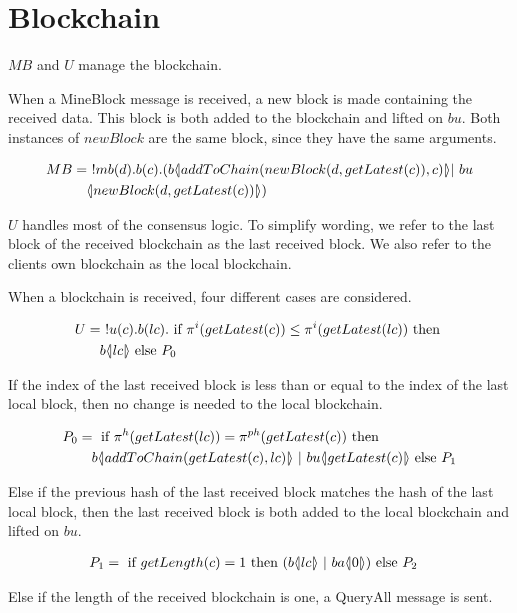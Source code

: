 \section{Blockchain}

$MB$ and $U$ manage the blockchain.

When a MineBlock message is received, a new block is made containing the received data.
This block is both added to the blockchain and lifted on $bu$.
Both instances of $newBlock$ are the same block, since they have the same arguments.

\begin{align*}
    MB &=\ !mb(d).b(c).(b  \langle \! | addToChain(newBlock(d,getLatest(c)),c) | \! \rangle| \ bu\\
    &\quad  \langle \! | newBlock(d, getLatest(c)) | \! \rangle)
\end{align*}

$U$ handles most of the consensus logic.
To simplify wording, we refer to the last block of the received blockchain as the last received block.
We also refer to the clients own blockchain as the local blockchain.

When a blockchain is received, four different cases are considered.

\begin{align*}
	U &=\ !u(c).b(lc).\text{ if }\pi^{i}( getLatest(c)) \leq \pi^{i}(getLatest(lc))\text{ then }\\
	&\quad b \langle \! | lc | \! \rangle\text{ else }P_0
\end{align*}

If the index of the last received block is less than or equal to the index of the last local block, then no change is needed to the local blockchain.

\begin{align*}
	P_0 &=\If{\pi^{h}(getLatest(lc))=\pi^{ph}(getLatest(c))}{\\
	&\quad b\lift{}{addToChain(getLatest(c),lc)}\ | \ bu\lift{}{getLatest(c)}}{P_1}
\end{align*}

Else if the previous hash of the last received block matches the hash of the last local block, then the last received block is both added to the local blockchain and lifted on $bu$.

\begin{align*}
	P_1 &=\text{ if }getLength(c)=1\text{ then }(b \langle \! | lc | \! \rangle\ |\ ba  \langle \! | 0 | \! \rangle)\text{ else }P_2
\end{align*}

Else if the length of the received blockchain is one, a QueryAll message is sent.

